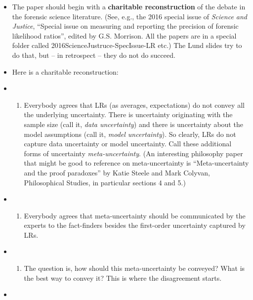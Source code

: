 \documentclass[
  10pt,
  dvipsnames,enabledeprecatedfontcommands]{scrartcl}
\providecommand{\tightlist}{%
  \setlength{\itemsep}{0pt}\setlength{\parskip}{0pt}}
\begin{document}
\begin{itemize}
\item
  The paper should begin with a \textbf{charitable reconstruction} of
  the debate in the forensic science literature. (See, e.g., the 2016
  special issue of \emph{Science and Justice}, ``Special issue on
  measuring and reporting the precision of forensic likelihood ratios'',
  edited by G.S. Morrison. All the papers are in a special folder called
  2016ScienceJustruce-SpecIssue-LR etc.) The Lund slides try to do that,
  but -- in retrospect -- they do not do succeed.
\item
  Here is a charitable reconstruction:
\item
  \begin{enumerate}
  \def\labelenumi{(\roman{enumi})}
  \tightlist
  \item
    Everybody agrees that LRs (as averages, expectations) do not convey
    all the underlying uncertainty. There is uncertainty originating
    with the sample size (call it, \emph{data uncertainty}) and there is
    uncertainty about the model assumptions (call it, \emph{model
    uncertainty}). So clearly, LRs do not capture data uncertainty or
    model uncertainty. Call these additional forms of uncertainty
    \emph{meta-uncertainty}. (An interesting philosophy paper that might
    be good to reference on meta-uncertainty is ``Meta-uncertainty and
    the proof paradoxes'' by Katie Steele and Mark Colyvan,
    Philosophical Studies, in particular sections 4 and 5.)
  \end{enumerate}
\item
  \begin{enumerate}
  \def\labelenumi{(\roman{enumi})}
  \setcounter{enumi}{1}
  \tightlist
  \item
    Everybody agrees that meta-uncertainty should be communicated by the
    experts to the fact-finders besides the first-order uncertainty
    captured by LRs.
  \end{enumerate}
\item
  \begin{enumerate}
  \def\labelenumi{(\roman{enumi})}
  \setcounter{enumi}{2}
  \tightlist
  \item
    The question is, how should this meta-uncertainty be conveyed? What
    is the best way to convey it? This is where the disagreement starts.
  \end{enumerate}
\item
  \begin{enumerate}
  \def\labelenumi{(\roman{enumi})}

\end{enumerate}
\end{itemize}
\end{document}
